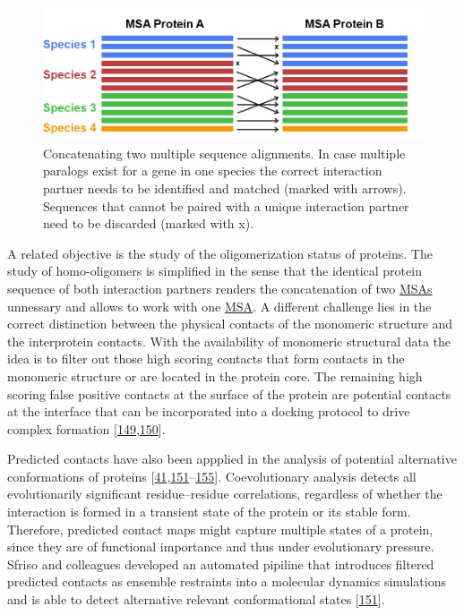 \documentclass[11pt,a4paper,twoside]{book}
\theoremstyle{definition}
\theoremstyle{definition}
\theoremstyle{remark}
\begin{document}
\begin{figure}

{\centering \includegraphics[width=1\linewidth]{img/intro/matching_sequences_ppi} 

}

\caption{Concatenating two multiple sequence
alignments. In case multiple paralogs exist for a gene in one species
the correct interaction partner needs to be identified and matched
(marked with arrows). Sequences that cannot be paired with a unique
interaction partner need to be discarded (marked with x).}\label{fig:matching-sequences-ppi}
\end{figure}

A related objective is the study of the oligomerization status of
proteins. The study of homo-oligomers is simplified in the sense that
the identical protein sequence of both interaction partners renders the
concatenation of two \protect\hyperlink{abbrev}{MSAs} unnessary and
allows to work with one \protect\hyperlink{abbrev}{MSA}. A different
challenge lies in the correct distinction between the physical contacts
of the monomeric structure and the interprotein contacts. With the
availability of monomeric structural data the idea is to filter out
those high scoring contacts that form contacts in the monomeric
structure or are located in the protein core. The remaining high scoring
false positive contacts at the surface of the protein are potential
contacts at the interface that can be incorporated into a docking
protocol to drive complex formation
{[}\protect\hyperlink{ref-Uguzzoni2017}{149},\protect\hyperlink{ref-DosSantos2015a}{150}{]}.

Predicted contacts have also been appplied in the analysis of potential
alternative conformations of proteins
{[}\protect\hyperlink{ref-Parisi2015a}{41},\protect\hyperlink{ref-Sfriso2016}{151}--\protect\hyperlink{ref-Jeon2011a}{155}{]}.
Coevolutionary analysis detects all evolutionarily significant
residue--residue correlations, regardless of whether the interaction is
formed in a transient state of the protein or its stable form.
Therefore, predicted contact maps might capture multiple states of a
protein, since they are of functional importance and thus under
evolutionary pressure. Sfriso and colleagues developed an automated
pipiline that introduces filtered predicted contacts as ensemble
restraints into a molecular dynamics simulations and is able to detect
alternative relevant conformational states
{[}\protect\hyperlink{ref-Sfriso2016}{151}{]}.
\end{document}
